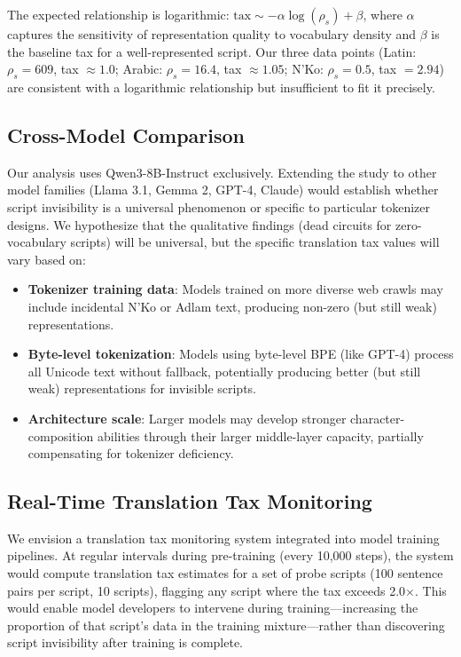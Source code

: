 \documentclass[11pt]{article}
\begin{document}
The expected relationship is logarithmic: $\text{tax} \sim -\alpha \log(\rho_s) + \beta$, where $\alpha$ captures the sensitivity of representation quality to vocabulary density and $\beta$ is the baseline tax for a well-represented script.
Our three data points (Latin: $\rho_s = 609$, tax $\approx 1.0$; Arabic: $\rho_s = 16.4$, tax $\approx 1.05$; N'Ko: $\rho_s = 0.5$, tax $= 2.94$) are consistent with a logarithmic relationship but insufficient to fit it precisely.

\subsection{Cross-Model Comparison}

Our analysis uses Qwen3-8B-Instruct exclusively.
Extending the study to other model families (Llama 3.1, Gemma 2, GPT-4, Claude) would establish whether script invisibility is a universal phenomenon or specific to particular tokenizer designs.
We hypothesize that the qualitative findings (dead circuits for zero-vocabulary scripts) will be universal, but the specific translation tax values will vary based on:
\begin{itemize}
\item \textbf{Tokenizer training data}: Models trained on more diverse web crawls may include incidental N'Ko or Adlam text, producing non-zero (but still weak) representations.
\item \textbf{Byte-level tokenization}: Models using byte-level BPE (like GPT-4) process all Unicode text without fallback, potentially producing better (but still weak) representations for invisible scripts.
\item \textbf{Architecture scale}: Larger models may develop stronger character-composition abilities through their larger middle-layer capacity, partially compensating for tokenizer deficiency.
\end{itemize}

\subsection{Real-Time Translation Tax Monitoring}

We envision a translation tax monitoring system integrated into model training pipelines.
At regular intervals during pre-training (every 10,000 steps), the system would compute translation tax estimates for a set of probe scripts (100 sentence pairs per script, 10 scripts), flagging any script where the tax exceeds 2.0$\times$.
This would enable model developers to intervene during training---increasing the proportion of that script's data in the training mixture---rather than discovering script invisibility after training is complete.
\end{document}
